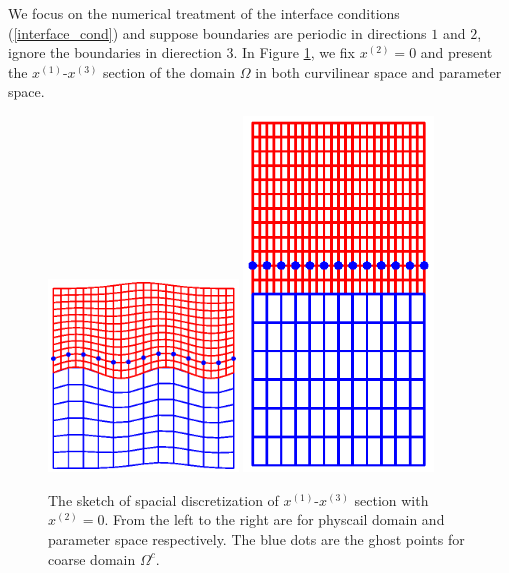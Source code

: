 We focus on the numerical treatment of the interface conditions (\ref{interface_cond}) and suppose boundaries are periodic in directions $1$ and $2$, ignore the boundaries in dierection $3$. In Figure \ref{section_discretization}, we fix $x^{(2)} = 0$ and present the $x^{(1)}$-$x^{(3)}$ section of the domain $\Omega$ in both curvilinear space and parameter space.
\begin{figure}[htbp]
	\centering
	\includegraphics[width=0.45\textwidth,trim={1.0cm 2.0cm 1.0cm 1.8cm}, clip]{physical_section_discretization.eps}
	\includegraphics[width=0.45\textwidth,trim={1.0cm 2.0cm 1cm 1.8cm}, clip]{parameter_section_discretization.eps}
	\caption{The sketch of spacial discretization of $x^{(1)}$-$x^{(3)}$ section with $x^{(2)} = 0$. From the left to the right are for physcail domain and parameter space respectively. The blue dots are the ghost points for coarse domain $\Omega^c$.}\label{section_discretization}
\end{figure}
